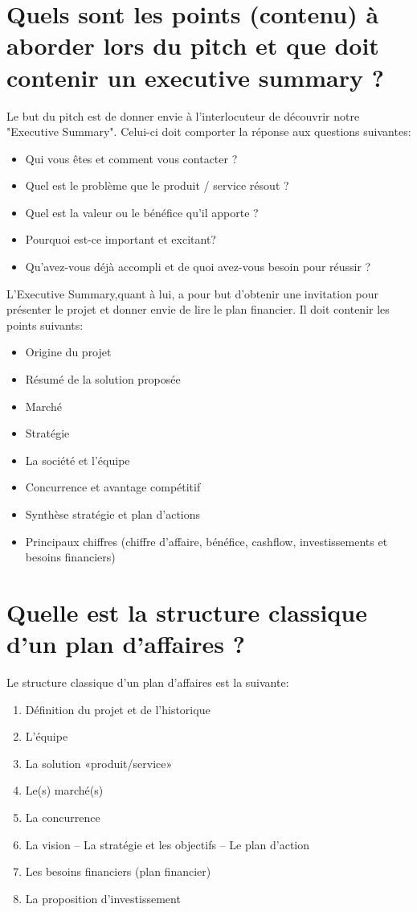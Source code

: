 \documentclass{article}
\begin{document}
\section{Quels sont les points (contenu) à aborder lors du pitch et que doit contenir un executive summary ?}
Le but du pitch est de donner envie à l'interlocuteur de découvrir notre "Executive
Summary". Celui-ci doit comporter la réponse aux questions suivantes: 
\begin{itemize}
\item Qui vous êtes et comment vous contacter ?
\item Quel est le problème que le produit / service résout ?
\item Quel est la valeur ou le bénéfice qu’il apporte ?
\item Pourquoi est-ce important et excitant?
\item Qu’avez-vous déjà accompli et de quoi avez-vous besoin pour réussir ?   
\end{itemize}
L'Executive Summary,quant à lui, a pour but d'obtenir une invitation pour présenter le projet et donner envie de lire le plan financier. Il doit contenir les points suivants:
\begin{itemize}
\item Origine du projet
\item Résumé de la solution proposée
\item Marché
\item Stratégie
\item La société et l’équipe
\item Concurrence et avantage compétitif
\item Synthèse stratégie et plan d’actions
\item Principaux chiffres (chiffre d'affaire, bénéfice, cashflow, investissements et besoins financiers)
\end{itemize}
\section{Quelle est la structure classique d’un plan d’affaires ?}
Le structure classique d'un plan d'affaires est la suivante:
\begin{enumerate}
\item Définition du projet et de l’historique
\item L’équipe
\item La solution «produit/service»
\item Le(s) marché(s)
\item La concurrence
\item La vision – La stratégie et les objectifs – Le  plan d’action
\item Les besoins financiers (plan financier)
\item La proposition d’investissement
\end{enumerate}
\end{document}
